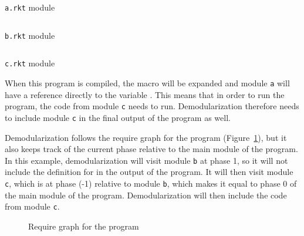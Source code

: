 \begin{listing}[tb]
  \inputminted{racket}{listings/a.rkt}
  \caption{\texttt{a.rkt} module}
  \label{lst:a.rkt}
\end{listing}

\begin{listing}[tb]
  \inputminted{racket}{listings/b.rkt}
  \caption{\texttt{b.rkt} module}
  \label{lst:b.rkt}
\end{listing}

\begin{listing}[tb]
  \inputminted{racket}{listings/c.rkt}
  \caption{\texttt{c.rkt} module}
  \label{lst:c.rkt}
\end{listing}

When this program is compiled, the macro will be expanded and module \texttt{a} will have a reference directly to the variable . 
This means that in order to run the program, the code from module \texttt{c} needs to run.
Demodularization therefore needs to include module \texttt{c} in the final output of the program as well.

Demodularization follows the require graph for the program (Figure~\ref{fig:d-modules.tex}), but it also keeps track of the current phase relative to the main module of the program.
In this example, demodularization will visit module \texttt{b} at phase 1, so it will not include the definition for  in the output of the program.
It will then visit module \texttt{c}, which is at phase (-1) relative to module \texttt{b}, which makes it equal to phase 0 of the main module of the program.
Demodularization will then include the code from module \texttt{c}.

\begin{figure}[tb]
  
  \caption{Require graph for the  program}
  \label{fig:d-modules.tex}
\end{figure}


